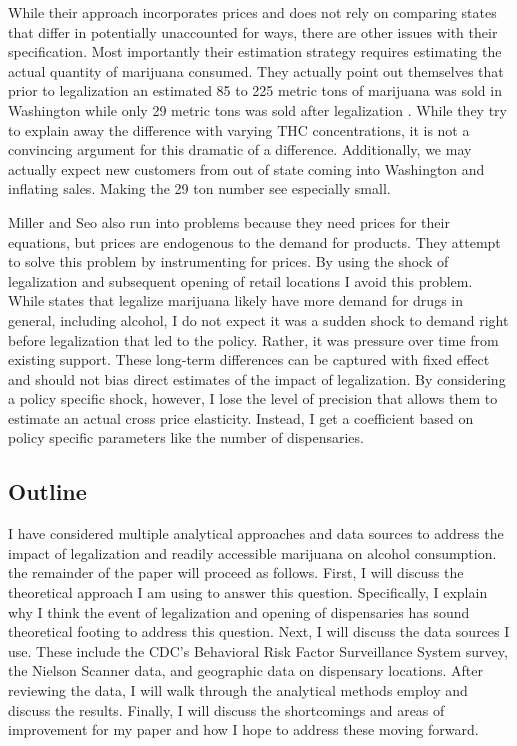 \documentclass[11pt]{article}
\begin{document}
While their approach incorporates prices and does not rely on comparing states that differ in potentially unaccounted for ways, there are other issues with their specification. Most importantly their estimation strategy requires estimating the actual quantity of marijuana consumed. They actually point out themselves that prior to legalization an estimated 85 to 225 metric tons of marijuana was sold in Washington while only 29 metric tons was sold after legalization \cite[p.~13]{ miller_seo_2018}.  While they try to explain away the difference with varying THC concentrations, it is not a convincing argument for this dramatic of a difference. Additionally, we may actually expect new customers from out of state coming into Washington and inflating sales. Making the 29 ton number see especially small. \par


Miller and Seo also run into problems because they need prices for their equations, but prices are endogenous to the demand for products. They attempt to solve this problem by instrumenting for prices. By using the shock of legalization and subsequent opening of retail locations I avoid this problem. While states that legalize marijuana likely have more demand for drugs in general, including alcohol, I do not expect it was a sudden shock to demand right before legalization that led to the policy. Rather, it was pressure over time from existing support. These long-term differences can be captured with fixed effect and should not bias direct estimates of the impact of legalization. By considering a policy specific shock, however, I lose the level of precision that allows them to estimate an actual cross price elasticity. Instead, I get a coefficient based on policy specific parameters like the number of dispensaries. 





\subsection{Outline}






I have considered multiple analytical approaches and data sources to address the impact of legalization and readily accessible marijuana on alcohol consumption. the remainder of the paper will proceed as follows. First, I will discuss the theoretical approach I am using to answer this question. Specifically, I explain why I think the event of legalization and opening of dispensaries has sound theoretical footing to address this question. Next, I will discuss the data sources I use. These include the CDC's Behavioral Risk Factor Surveillance System survey, the Nielson Scanner data, and geographic data on dispensary locations. After reviewing the data, I will walk through the analytical methods employ and discuss the results. Finally, I will discuss the shortcomings and areas of improvement for my paper and how I hope to address these moving forward. 
\end{document}

